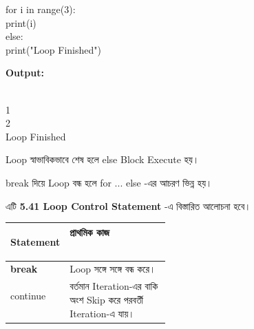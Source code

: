 \begin{codebox}
\begin{english}
\ttfamily
for i in range(3):\\
\hspace*{4mm}print(i)\\
else:\\
\hspace*{4mm}print("Loop Finished")
\end{english}
\end{codebox}

\textbf{Output:}

\begin{codebox}
\begin{english}
\\
1\\
2\\
Loop Finished
\end{english}
\end{codebox}

Loop স্বাভাবিকভাবে শেষ হলে
\textenglish{\ttfamily else}
Block Execute হয়।

\begin{rememberbox}

\textenglish{\ttfamily break}
দিয়ে Loop বন্ধ হলে
\textenglish{\ttfamily for ... else}
-এর আচরণ ভিন্ন হয়।

এটি
\textbf{5.41 Loop Control Statement}
-এ বিস্তারিত আলোচনা হবে।

\end{rememberbox}



\begin{tabularx}
{\linewidth}
{
|>{\bfseries\RaggedRight\arraybackslash}p{0.27\linewidth}
|Y|
}

\hline
{}

\textbf{Statement}
&
\textbf{প্রাথমিক কাজ}
\\
\hline

\textenglish{\ttfamily break}
&
Loop সঙ্গে সঙ্গে বন্ধ করে।
\\
\hline

\textenglish{\ttfamily continue}
&
বর্তমান Iteration-এর বাকি অংশ Skip করে পরবর্তী Iteration-এ যায়।
\\
\hline

\end{tabularx}


